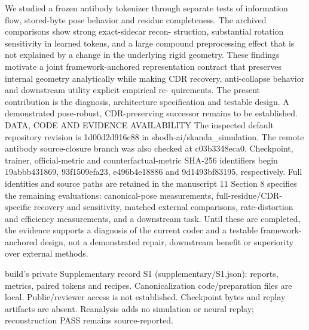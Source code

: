 \documentclass[11pt]{article}
\begin{document}
We studied a frozen antibody tokenizer through separate tests of information flow, stored-byte pose
behavior and residue completeness. The archived comparisons show strong exact-sidecar recon-
struction, substantial rotation sensitivity in learned tokens, and a large compound preprocessing
effect that is not explained by a change in the underlying rigid geometry. These findings motivate
a joint framework-anchored representation contract that preserves internal geometry analytically
while making CDR recovery, anti-collapse behavior and downstream utility explicit empirical re-
quirements. The present contribution is the diagnosis, architecture specification and testable design.
A demonstrated pose-robust, CDR-preserving successor remains to be established.
DATA, CODE AND EVIDENCE AVAILABILITY
The inspected default repository revision is 1d00d2d916c88 in
shodh-ai/skanda\_simulation. The remote antibody source-closure branch was also
checked at c03b3348eca0. Checkpoint, trainer, official-metric and counterfactual-metric
SHA-256 identifiers begin 19abbb431869, 93f1509efa23, e496b4e18886 and
9d1493bf83195, respectively. Full identities and source paths are retained in the manuscript
11
Section 8 specifies the remaining evaluations: canonical-pose measurements,
full-residue/CDR-specific recovery and sensitivity, matched external comparisons, rate-distortion
and efficiency measurements, and a downstream task. Until these are completed, the evidence
supports a diagnosis of the current codec and a testable framework-anchored design, not a
demonstrated repair, downstream benefit or superiority over external methods.








build's private Supplementary record S1 (supplementary/S1.json): reports, metrics, paired tokens
and recipes. Canonicalization code/preparation files are local. Public/reviewer access is not
established. Checkpoint bytes and replay artifacts are absent. Reanalysis adds no simulation or
neural replay; reconstruction PASS remains source-reported.
\end{document}
